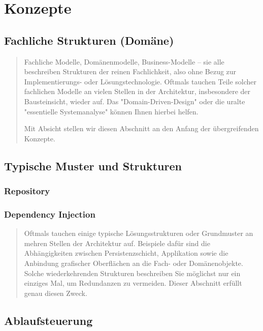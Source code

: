 \chapter{Konzepte}

\section{Fachliche Strukturen (Domäne)}

\begin{quote}
	Fachliche Modelle, Domänenmodelle, Business-Modelle – sie alle beschreiben Strukturen der reinen Fachlichkeit, also ohne Bezug zur Implementierungs- oder Lösungstechnologie.
	Oftmals tauchen Teile solcher fachlichen Modelle an vielen Stellen in der Architektur, insbesondere der Bausteinsicht, wieder auf. 
	Das "Domain-Driven-Design" oder die uralte "essentielle Systemanalyse" können Ihnen hierbei helfen.
	
	Mit Absicht stellen wir diesen Abschnitt an den Anfang der übergreifenden Konzepte.
\end{quote}

\section{Typische Muster und Strukturen}

\subsection{Repository}

\subsection{Dependency Injection}

\begin{quote}
	Oftmals tauchen einige typische Lösungsstrukturen oder Grundmuster an mehren Stellen der Architektur auf. Beispiele dafür sind die Abhängigkeiten zwischen Persistenzschicht, Applikation sowie die Anbindung grafischer Oberflächen an die Fach- oder Domänenobjekte. Solche wiederkehrenden Strukturen beschreiben Sie möglichst nur ein einziges Mal, um Redundanzen zu vermeiden. Dieser Abschnitt erfüllt genau diesen Zweck.
\end{quote}

\section{Ablaufsteuerung}

